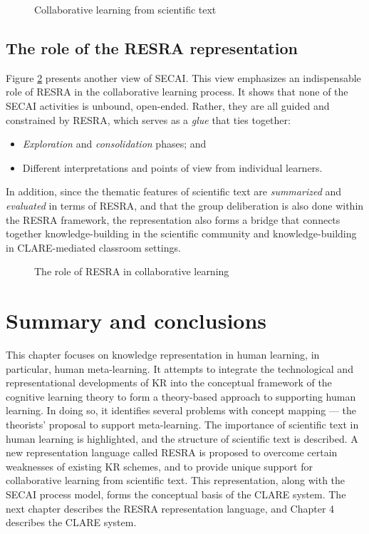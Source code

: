 \begin{figure}
  \caption{Collaborative learning from scientific text}
  \label{fig:secai-2}
\end{figure}


\subsection{The role of the RESRA representation}

Figure \ref{fig:kr-role} presents another view of SECAI. This view
emphasizes an indispensable role of RESRA in the collaborative learning
process. It shows that none of the SECAI activities is unbound, open-ended.
Rather, they are all guided and constrained by RESRA, which serves as a
{\it glue\/} that ties together:

\begin{itemize}
\item {\it Exploration\/} and {\it consolidation\/} phases; and
  
\item Different interpretations and points of view from individual
  learners.
\end{itemize}

In addition, since the thematic features of scientific text are {\it
summarized\/} and {\it evaluated\/} in terms of RESRA, and that the group
deliberation is also done within the RESRA framework, the representation
also forms a bridge that connects together knowledge-building in the
scientific community and knowledge-building in CLARE-mediated classroom
settings.

\begin{figure}
  \caption{The role of RESRA in collaborative learning}
  \label{fig:kr-role}
\end{figure}


\section{Summary and conclusions}
\label{sec:summary}

This chapter focuses on knowledge representation in human learning, in
particular, human meta-learning. It attempts to integrate the technological
and representational developments of KR into the conceptual framework of
the cognitive learning theory to form a theory-based approach to supporting
human learning. In doing so, it identifies several problems with concept
mapping --- the theorists' proposal to support meta-learning. The importance
of scientific text in human learning is highlighted, and the structure of
scientific text is described. A new representation language called RESRA is
proposed to overcome certain weaknesses of existing KR schemes, and to
provide unique support for collaborative learning from scientific text.
This representation, along with the SECAI process model, forms the
conceptual basis of the CLARE system. The next chapter describes the RESRA
representation language, and Chapter 4 describes the CLARE system.


